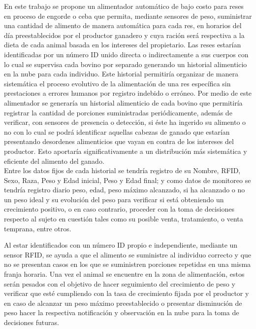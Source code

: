 En este trabajo se propone un alimentador automático de bajo costo para reses en proceso de engorde o ceba que permita, mediante sensores de peso, suministrar una cantidad de alimento de manera automática para cada res, en horarios del día preestablecidos por el productor ganadero y cuya ración será respectiva a la dieta de cada animal basada en los intereses del propietario. Las reses estarían identificadas por un número ID unido directa o indirectamente a sus cuerpos con lo cual se supervisa cada bovino por separado generando un historial alimenticio en la nube para cada individuo. Este historial permitiría organizar de manera sistemática el proceso evolutivo de la alimentación de una res específica sin prestaciones a errores humanos por registro indebido o erróneo.
Por medio de este alimentador se generaría un historial alimenticio de cada bovino que permitiría registrar la cantidad de porciones suministradas periódicamente, además de verificar, con sensores de presencia o detección,  si éste ha ingerido su alimento o no con lo cual se podrá identificar aquellas cabezas de ganado que estarían presentando desordenes alimenticios que vayan en contra de los intereses del productor. Esto aportaría significativamente a un distribución más sistemática  y eficiente del alimento del ganado.\\

Entre los datos fijos de cada historial se tendría registro de su Nombre, RFID, Sexo, Raza, Peso y Edad inicial, Peso y Edad final; y como datos de monitoreo se tendría registro diario peso, edad, peso máximo alcanzado, si ha alcanzado o no un peso ideal y su evolución del peso para verificar si está obteniendo un crecimiento positivo, o en caso contrario, proceder con la toma de decisiones respecto al sujeto en cuestión tales como su posible venta, tratamiento, o venta temprana, entre otros.

Al estar identificados con un número ID propio e independiente, mediante un sensor RFID, se ayuda a que el alimento se suministre al individuo correcto y que no se presentan casos en los que se suministren porciones repetidas en una misma franja horaria. Una vez el animal se encuentre en la zona de alimentación, estos serán pesados con el objetivo de hacer seguimiento del crecimiento de peso y verificar que esté cumpliendo con la tasa de crecimiento fijada por el productor y en caso de alcanzar un peso máximo preestablecido o presentar disminución de peso hacer la respectiva notificación y observación en la nube para la toma de decisiones futuras.\\

